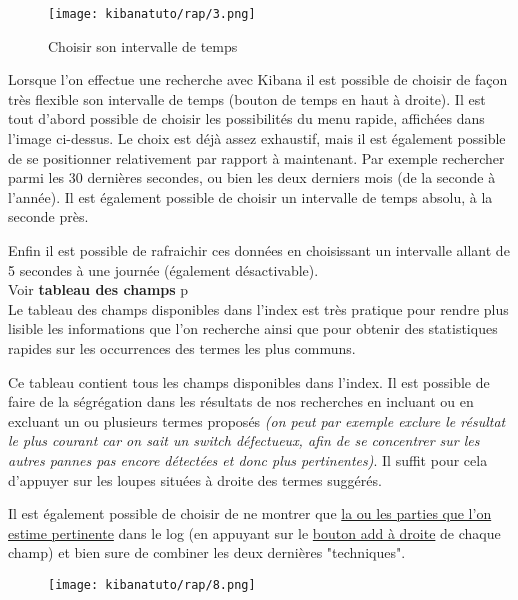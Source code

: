 \begin{figure}[H]
\center
\texttt{[image: kibanatuto/rap/3.png]}
\label{fig:kibanatuto3}
\caption{Choisir son intervalle de temps}
\end{figure}
Lorsque l'on effectue une recherche avec Kibana il est possible de choisir de façon
très flexible son intervalle de temps (bouton de temps en haut à droite).
Il est tout d'abord possible de choisir les possibilités du menu rapide, affichées
dans l'image ci-dessus. Le choix est déjà assez exhaustif, mais il est également 
possible de se positionner relativement par rapport à maintenant. Par exemple rechercher 
parmi les 30 dernières secondes, ou bien les deux derniers mois (de la seconde à 
l'année). Il est également possible de choisir un intervalle de temps absolu, à 
la seconde près.

Enfin il est possible de rafraichir ces données en choisissant un intervalle allant
de 5 secondes à une journée (également désactivable).\\[2mm]
Voir \textbf{tableau des champs} p\pageref{fig:kibanatuto4}\\[2mm]

Le tableau des champs disponibles dans l'index est très pratique pour rendre plus 
lisible les informations que l'on recherche ainsi que pour obtenir des statistiques 
rapides sur les occurrences des termes les plus communs.

Ce tableau contient tous les champs disponibles dans l'index. Il est possible de
faire de la ségrégation dans les résultats de nos recherches en incluant ou en   
excluant un ou plusieurs termes proposés {\footnotesize\textit{(on peut par exemple exclure le résultat 
le plus courant car on sait un switch défectueux, afin de se concentrer sur les autres
pannes pas encore détectées et donc plus pertinentes)}}. Il suffit pour cela d'appuyer
sur les loupes situées à droite des termes suggérés.


Il est également possible de choisir de ne montrer que \hyperref[fig:kibanatuto6]{la ou les parties que l'on 
estime pertinente} dans le log (en appuyant sur le \hyperref[fig:kibanatuto5]{bouton 
add à droite} de chaque champ) et bien sure de combiner les deux dernières "techniques".
\begin{figure}[H]
\begin{flushright}
\texttt{[image: kibanatuto/rap/8.png]}
\label{fig:kibanatuto5}
\end{flushright}%
\end{figure}

